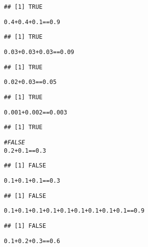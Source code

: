 \documentclass{article}\usepackage[]{graphicx}\usepackage[]{color}
\makeatletter
\newcommand{\hlnum}[1]{\textcolor[rgb]{0.686,0.059,0.569}{#1}}%
\newcommand{\hlcom}[1]{\textcolor[rgb]{0.678,0.584,0.686}{\textit{#1}}}%
\newcommand{\hlopt}[1]{\textcolor[rgb]{0,0,0}{#1}}%
\newenvironment{kframe}{%
 \def\at@end@of@kframe{}%
 \ifinner\ifhmode%
  \def\at@end@of@kframe{\end{minipage}}%
  \begin{minipage}{\columnwidth}%
 \fi\fi%
 \def\FrameCommand##1{\hskip\@totalleftmargin \hskip-\fboxsep
 \colorbox{shadecolor}{##1}\hskip-\fboxsep
     \hskip-\linewidth \hskip-\@totalleftmargin \hskip\columnwidth}%
 \MakeFramed {\advance\hsize-\width
   \@totalleftmargin\z@ \linewidth\hsize
   \@setminipage}}%
 {\par\unskip\endMakeFramed%
 \at@end@of@kframe}
\newenvironment{knitrout}{}{} %
\makeatother
\begin{document}
\begin{knitrout}
\begin{kframe}
\begin{alltt}
\end{alltt}
\begin{verbatim}
## [1] TRUE
\end{verbatim}
\begin{alltt}
\hlnum{0.4} \hlopt{+} \hlnum{0.4} \hlopt{+} \hlnum{0.1} \hlopt{==} \hlnum{0.9}
\end{alltt}
\begin{verbatim}
## [1] TRUE
\end{verbatim}
\begin{alltt}
\hlnum{0.03} \hlopt{+} \hlnum{0.03} \hlopt{+} \hlnum{0.03} \hlopt{==} \hlnum{0.09}
\end{alltt}
\begin{verbatim}
## [1] TRUE
\end{verbatim}
\begin{alltt}
\hlnum{0.02} \hlopt{+} \hlnum{0.03} \hlopt{==} \hlnum{0.05}
\end{alltt}
\begin{verbatim}
## [1] TRUE
\end{verbatim}
\begin{alltt}
\hlnum{0.001} \hlopt{+} \hlnum{0.002} \hlopt{==} \hlnum{0.003}
\end{alltt}
\begin{verbatim}
## [1] TRUE
\end{verbatim}
\begin{alltt}
\hlcom{#FALSE}
\hlnum{0.2} \hlopt{+} \hlnum{0.1} \hlopt{==} \hlnum{0.3}
\end{alltt}
\begin{verbatim}
## [1] FALSE
\end{verbatim}
\begin{alltt}
\hlnum{0.1} \hlopt{+} \hlnum{0.1} \hlopt{+} \hlnum{0.1} \hlopt{==} \hlnum{0.3}
\end{alltt}
\begin{verbatim}
## [1] FALSE
\end{verbatim}
\begin{alltt}
\hlnum{0.1} \hlopt{+} \hlnum{0.1} \hlopt{+} \hlnum{0.1} \hlopt{+} \hlnum{0.1} \hlopt{+} \hlnum{0.1} \hlopt{+} \hlnum{0.1} \hlopt{+} \hlnum{0.1} \hlopt{+} \hlnum{0.1} \hlopt{+} \hlnum{0.1} \hlopt{==} \hlnum{0.9}
\end{alltt}
\begin{verbatim}
## [1] FALSE
\end{verbatim}
\begin{alltt}
\hlnum{0.1} \hlopt{+} \hlnum{0.2} \hlopt{+} \hlnum{0.3} \hlopt{==} \hlnum{0.6}
\end{alltt}

\end{kframe}
\end{knitrout}
\end{document}
